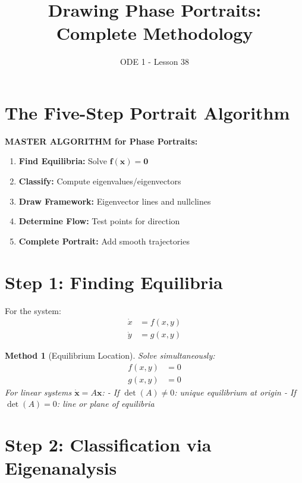 \documentclass[12pt]{article}
\title{Drawing Phase Portraits: Complete Methodology}
\author{ODE 1 - Lesson 38}
\date{}
\newtheorem{method}{Method}
\begin{document}
\maketitle

\section{The Five-Step Portrait Algorithm}

\begin{stepbox}
\textbf{MASTER ALGORITHM for Phase Portraits:}
\begin{enumerate}
    \item \textbf{Find Equilibria:} Solve $\mathbf{f}(\mathbf{x}) = \mathbf{0}$
    \item \textbf{Classify:} Compute eigenvalues/eigenvectors
    \item \textbf{Draw Framework:} Eigenvector lines and nullclines
    \item \textbf{Determine Flow:} Test points for direction
    \item \textbf{Complete Portrait:} Add smooth trajectories
\end{enumerate}
\end{stepbox}

\section{Step 1: Finding Equilibria}

For the system:
\begin{align}
\dot{x} &= f(x,y) \\
\dot{y} &= g(x,y)
\end{align}

\begin{method}[Equilibrium Location]
Solve simultaneously:
\begin{align}
f(x,y) &= 0 \\
g(x,y) &= 0
\end{align}
For linear systems $\dot{\mathbf{x}} = A\mathbf{x}$:
- If $\det(A) \neq 0$: unique equilibrium at origin
- If $\det(A) = 0$: line or plane of equilibria
\end{method}

\section{Step 2: Classification via Eigenanalysis}
\end{document}
